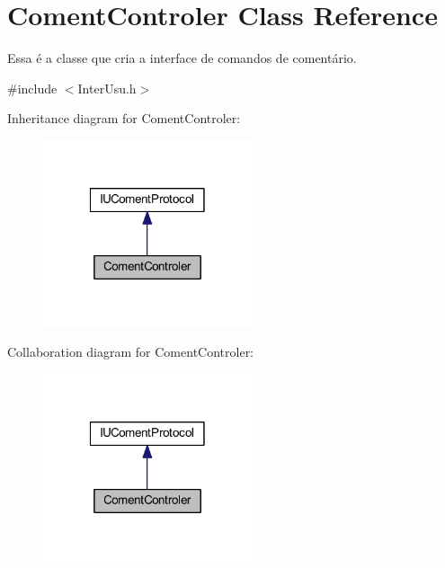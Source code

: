 \hypertarget{class_coment_controler}{\section{Coment\-Controler Class Reference}
\label{class_coment_controler}
}


Essa é a classe que cria a interface de comandos de comentário.  




{\ttfamily \#include $<$Inter\-Usu.\-h$>$}



Inheritance diagram for Coment\-Controler\-:
\nopagebreak
\begin{figure}[H]
\begin{center}
\leavevmode
\includegraphics[width=174pt]{class_coment_controler__inherit__graph}
\end{center}
\end{figure}


Collaboration diagram for Coment\-Controler\-:
\nopagebreak
\begin{figure}[H]
\begin{center}
\leavevmode
\includegraphics[width=174pt]{class_coment_controler__coll__graph}
\end{center}
\end{figure}
